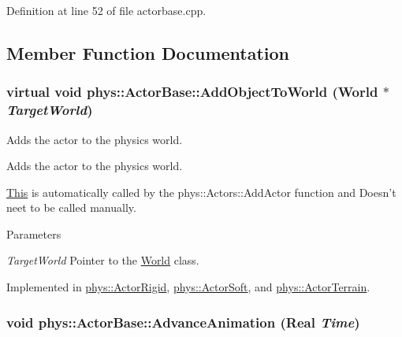 Definition at line 52 of file actorbase.cpp.



\subsection{Member Function Documentation}
\hypertarget{classphys_1_1ActorBase_a3d28e4c4a33f50210101695cb33ded3b}{
\subsubsection[{AddObjectToWorld}]{\setlength{\rightskip}{0pt plus 5cm}virtual void phys::ActorBase::AddObjectToWorld ({\bf World} $\ast$ {\em TargetWorld})}}
\label{d8/d0f/classphys_1_1ActorBase_a3d28e4c4a33f50210101695cb33ded3b}


Adds the actor to the physics world. 

Adds the actor to the physics world. \par
 \hyperlink{structThis}{This} is automatically called by the phys::Actors::AddActor function and Doesn't neet to be called manually. 
\begin{DoxyParams}{Parameters}
\item[{\em TargetWorld}]Pointer to the \hyperlink{classphys_1_1World}{World} class. \end{DoxyParams}


Implemented in \hyperlink{classphys_1_1ActorRigid_acaf29ca7058b39185dd09a5059200e91}{phys::ActorRigid}, \hyperlink{classphys_1_1ActorSoft_a5f97915d1cda0d048853718714a26d93}{phys::ActorSoft}, and \hyperlink{classphys_1_1ActorTerrain_a890ee6f67fda30381bce9c949ae36566}{phys::ActorTerrain}.

\hypertarget{classphys_1_1ActorBase_a37d5a8a3ae4ca3c6e7d14706096faa85}{
\subsubsection[{AdvanceAnimation}]{\setlength{\rightskip}{0pt plus 5cm}void phys::ActorBase::AdvanceAnimation ({\bf Real} {\em Time})}}
\label{d8/d0f/classphys_1_1ActorBase_a37d5a8a3ae4ca3c6e7d14706096faa85}


